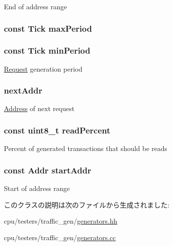 \label{classLinearGen_a1f198116a3da3ee4d73abf4760f70815}
End of address range \hypertarget{classLinearGen_a1c8c13cc371c24fa5cbb14c737c97f9d}{
\subsubsection[{maxPeriod}]{\setlength{\rightskip}{0pt plus 5cm}const {\bf Tick} {\bf maxPeriod}}}
\label{classLinearGen_a1c8c13cc371c24fa5cbb14c737c97f9d}
\hypertarget{classLinearGen_a4e49eae3c2467df5de83a296f8123619}{
\subsubsection[{minPeriod}]{\setlength{\rightskip}{0pt plus 5cm}const {\bf Tick} {\bf minPeriod}}}
\label{classLinearGen_a4e49eae3c2467df5de83a296f8123619}
\hyperlink{classRequest}{Request} generation period \hypertarget{classLinearGen_a76968ef2ad8d208fe33cfb493986e85a}{
\subsubsection[{nextAddr}]{ {\bf nextAddr}}}
\label{classLinearGen_a76968ef2ad8d208fe33cfb493986e85a}
\hyperlink{classAddress}{Address} of next request \hypertarget{classLinearGen_af72793641cb115852317a23ca19dc514}{
\subsubsection[{readPercent}]{\setlength{\rightskip}{0pt plus 5cm}const uint8\_\-t {\bf readPercent}}}
\label{classLinearGen_af72793641cb115852317a23ca19dc514}
Percent of generated transactions that should be reads \hypertarget{classLinearGen_a6aeb968ddd05c079215ef147ed22708a}{
\subsubsection[{startAddr}]{\setlength{\rightskip}{0pt plus 5cm}const {\bf Addr} {\bf startAddr}}}
\label{classLinearGen_a6aeb968ddd05c079215ef147ed22708a}
Start of address range 

このクラスの説明は次のファイルから生成されました:\begin{DoxyCompactItemize}
\item 
cpu/testers/traffic\_\-gen/\hyperlink{generators_8hh}{generators.hh}\item 
cpu/testers/traffic\_\-gen/\hyperlink{generators_8cc}{generators.cc}\end{DoxyCompactItemize}
